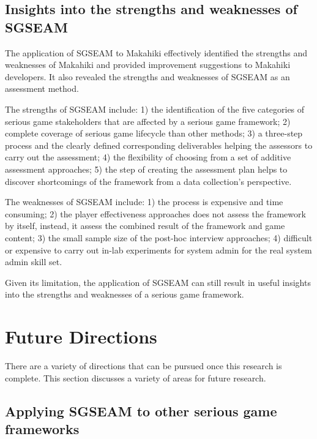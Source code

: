 \subsection{Insights into the strengths and weaknesses of SGSEAM}

The application of SGSEAM to Makahiki effectively identified the strengths and weaknesses of Makahiki and provided improvement suggestions to Makahiki developers. It also revealed the strengths and weaknesses of SGSEAM as an assessment method. 

The strengths of SGSEAM include: 1) the identification of the five categories of serious game stakeholders that are affected by a serious game framework; 2) complete coverage of serious game lifecycle than other methods; 3) a three-step process and the clearly defined corresponding deliverables helping the assessors to carry out the assessment; 4) the flexibility of choosing from a set of additive assessment approaches; 5) the step of creating the assessment plan helps to discover shortcomings of the framework from a data collection's perspective.

The weaknesses of SGSEAM include: 1) the process is expensive and time consuming; 2) the player effectiveness approaches does not assess the framework by itself, instead, it assess the combined result of the framework and game content; 3) the small sample size of the post-hoc interview approaches; 4) difficult or expensive to carry out in-lab experiments for system admin for the real system admin skill set.

Given its limitation, the application of SGSEAM can still result in useful insights into the strengths and weaknesses of a serious game framework.

\section{Future Directions}

There are a variety of directions that can be pursued once this research is complete. This section discusses a variety of areas for future research.

\subsection{Applying SGSEAM to other serious game frameworks}
\label{future:other-framework}

